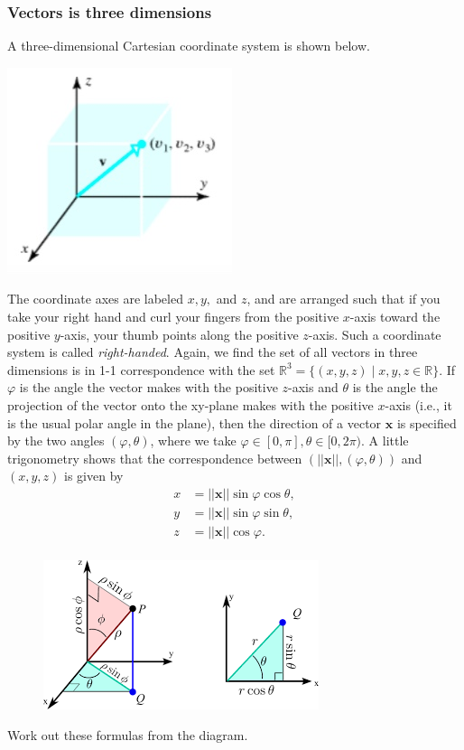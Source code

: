 \documentclass[12pt,letterpaper,reqno]{article}
\numberwithin{equation}{section}
\newcommand{\R}{\ensuremath{\mathbb R}}
\begin{document}
\subsubsection{Vectors is three dimensions}
A three-dimensional Cartesian coordinate system is shown below. 
\begin{center}
	\includegraphics[scale=0.5]{figures_mvc/components}
\end{center}
The coordinate axes are labeled $x,y,$ and $z$, and are arranged such that if you take your right hand and curl your fingers from the positive $x$-axis toward the positive $y$-axis, your thumb points along the positive $z$-axis. Such a coordinate system is called \emph{right-handed}. Again, we find the set of all vectors in three dimensions is in 1-1 correspondence with the set $\R^3=\{(x,y,z) \mid x,y,z \in \R\}$. If $\varphi$ is the angle the vector makes with the positive $z$-axis and $\theta$ is the angle the projection of the vector onto the xy-plane makes with the positive $x$-axis (i.e., it is the usual polar angle in the plane), then the direction of a vector $\mathbf{x}$ is specified by the two angles $(\varphi,\theta)$, where we take $\varphi \in [0,\pi], \theta \in [0,2\pi)$. A little trigonometry shows that the correspondence between $(||\mathbf{x}||,(\varphi,\theta))$ and $(x,y,z)$ is given by
\begin{align}\label{eq:x_spher}
	x&=||\mathbf{x}||\sin \varphi \cos \theta, \\ \label{eq:y_spher}
	y&=||\mathbf{x}||\sin \varphi \sin \theta, \\ \label{eq:z_spher}
	z&=||\mathbf{x}||\cos \varphi. \\
\end{align}
\begin{figure}[h]
\begin{center}
	\includegraphics[scale=0.8]{figures_mvc/speric_coor}
\end{center}
\end{figure}
\begin{exercise}
Work out these formulas from the diagram.	
\end{exercise}
\end{document}
